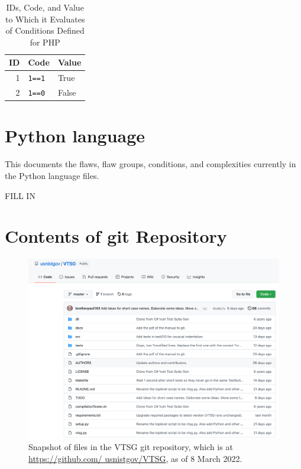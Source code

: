 \documentclass[12pt]{article}
\begin{document}
\begin{table}[H]
\centering
\begin{tabular}{|r|l|l|}
\hline
\textbf{ID} & \textbf{Code} & \textbf{Value} \\
\hline
1 & \verb|1==1| & True \\
\hline
2 & \verb|1==0| & False \\
\hline
\end{tabular}
\caption{IDs, Code, and Value to Which it Evaluates of Conditions Defined for
  PHP}
\label{tab:condition IDs for PHP}
\end{table}


\section{Python language}
\label{sec:Python language}

This documents the flaws, flaw groups, conditions, and complexities currently in the
Python language files.

{\Large FILL IN}

\clearpage

\section{Contents of git Repository}
\label{gitContent}

\begin{figure}[htbp]
  \includegraphics[width=1\linewidth]{fig_git_files.png}
  \caption{Snapshot of files in the VTSG git repository, which is at
    \href{https://github.com/usnistgov/VTSG}{https://github.com/ usnistgov/VTSG},
    as of 8 March 2022.}
  \label{fig:git files}
\end{figure}
\end{document}
